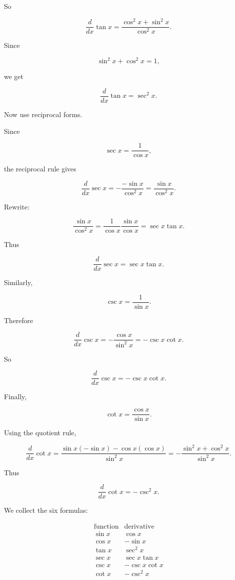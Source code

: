 So

\[
\frac{d}{dx}\tan x
=
\frac{\cos^2x+\sin^2x}{\cos^2x}.
\]

Since

\[
\sin^2x+\cos^2x=1,
\]

we get

\[
\boxed{
\frac{d}{dx}\tan x=\sec^2x.
}
\]

Now use reciprocal forms.

Since

\[
\sec x=\frac1{\cos x},
\]

the reciprocal rule gives

\[
\frac{d}{dx}\sec x
=
-\frac{-\sin x}{\cos^2x}
=
\frac{\sin x}{\cos^2x}.
\]

Rewrite:

\[
\frac{\sin x}{\cos^2x}
=
\frac1{\cos x}\frac{\sin x}{\cos x}
=
\sec x\tan x.
\]

Thus

\[
\boxed{
\frac{d}{dx}\sec x=\sec x\tan x.
}
\]

Similarly,

\[
\csc x=\frac1{\sin x}.
\]

Therefore

\[
\frac{d}{dx}\csc x
=
-\frac{\cos x}{\sin^2x}
=
-\csc x\cot x.
\]

So

\[
\boxed{
\frac{d}{dx}\csc x=-\csc x\cot x.
}
\]

Finally,

\[
\cot x=\frac{\cos x}{\sin x}.
\]

Using the quotient rule,

\[
\frac{d}{dx}\cot x
=
\frac{\sin x(-\sin x)-\cos x(\cos x)}{\sin^2x}
=
-\frac{\sin^2x+\cos^2x}{\sin^2x}.
\]

Thus

\[
\boxed{
\frac{d}{dx}\cot x=-\csc^2x.
}
\]

We collect the six formulas:

\[
\boxed{
\begin{array}{c|c}
\text{function} & \text{derivative} \\ \hline
\sin x & \cos x \\[3pt]
\cos x & -\sin x \\[3pt]
\tan x & \sec^2x \\[3pt]
\sec x & \sec x\tan x \\[3pt]
\csc x & -\csc x\cot x \\[3pt]
\cot x & -\csc^2x
\end{array}
}
\]

